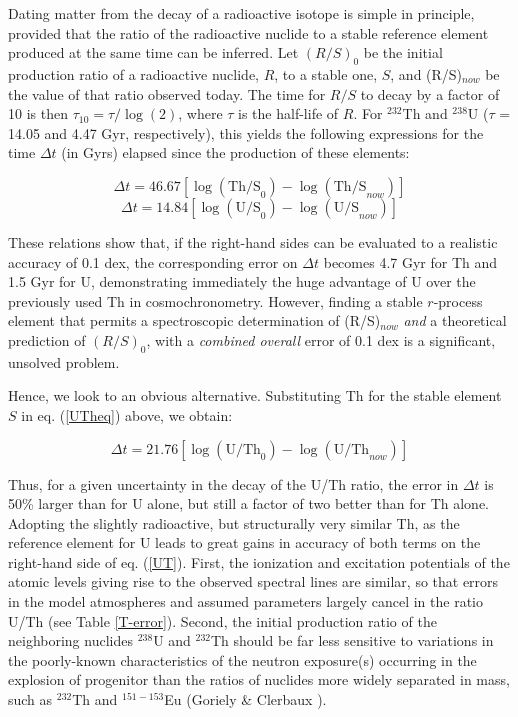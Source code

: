 \documentclass{aa}
\begin{document}
Dating matter from the decay of a radioactive isotope is simple in
principle, provided that the ratio of the radioactive nuclide to a stable
reference element produced at the same time can be inferred. Let $(R/S)_0$
be the initial production ratio of a radioactive nuclide, $R$, to a stable one,
$S$, and (R/S)$_{now}$ be the value of that ratio observed today. The time for
$R/S$ to decay by a factor of 10 is then $\tau_{10} = \tau / \log (2)$,
where $\tau$ is the half-life of $R$. For $^{232}$Th and $^{238}$U ($\tau$
= 14.05 and 4.47 Gyr, respectively), this yields the following expressions
for the time $\Delta t$ (in Gyrs) elapsed since the production of these elements:

\begin{equation}
\Delta t = 46.67[\log(\mathrm{Th/S}_0)-\log(\mathrm{Th/S}_{now})]
\end{equation}
\begin{equation}\label{UTheq}
\Delta t =14.84[\log(\mathrm{U/S}_0)-\log(\mathrm{U/S}_{now})]
\end{equation}

These relations show that, if the right-hand sides can be evaluated to a
realistic accuracy of 0.1 dex, the corresponding error on $\Delta t$ becomes
4.7 Gyr for Th and 1.5 Gyr for U, demonstrating immediately the huge 
advantage of U over the previously used Th in cosmochronometry. However,
finding a stable $r$-process element that permits a spectroscopic
determination of (R/S)$_{now}$ {\it and} a theoretical prediction of $(R/S)_0$,
with a {\it combined overall} error of 0.1 dex is a significant, unsolved
problem.  

Hence, we look to an obvious alternative.  Substituting Th for the
stable element $S$ in eq. (\ref{UTheq}) above, we obtain:

\begin{equation}\label{UT}
   \Delta t =21.76[\log(\mathrm{U/Th}_0)-\log(\mathrm{U/Th}_{now})]
\end{equation}

Thus, for a given uncertainty in the decay of the U/Th ratio, the error in
$\Delta t$ is 50\% larger than for U alone, but still a factor of two 
better than
for Th alone. Adopting the slightly radioactive, but structurally very similar
Th, as the reference element for U leads to great gains in accuracy of both
terms on the right-hand side of eq. (\ref{UT}).  First, the ionization and
excitation potentials of the atomic levels giving rise to the observed spectral
lines are similar, so that errors in the model atmospheres and assumed
parameters largely cancel in the ratio U/Th (see Table \ref{T-error}).  Second,
the initial production ratio of the neighboring nuclides $^{238}$U and
$^{232}$Th should be far less sensitive to variations in the poorly-known
characteristics of the neutron exposure(s) occurring in the explosion of
progenitor than the ratios of nuclides more widely separated in mass, such as
$^{232}$Th and $^{151-153}$Eu (Goriely \& Clerbaux \cite{goriely99}).
\end{document}
